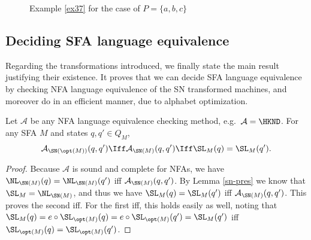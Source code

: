 \begin{example}
\begin{figure}
\caption{Example \ref{ex37} for the case of $P = \{a, b, c\}$}
\begin{center}
\end{center}
\end{figure}

\end{example}


\subsection{Deciding SFA language equivalence}
\label{wrapup}

Regarding the transformations introduced, we finally state the main result justifying their existence. It proves that we can decide SFA language equivalence by checking NFA language equivalence of the SN transformed machines, and moreover do in an efficient manner, due to alphabet optimization.

\begin{thm}
Let $\mathcal{A}$ be any NFA language equivalence checking method, e.g.~$\mathcal{A} = \HKND$. For any SFA $M$ and states $q,q' \in Q_M$,
\begin{equation*}
\mathcal{A}_{\SN(\opt(M))}(q,q') \Iff
\mathcal{A}_{\SN(M)}(q,q') \Iff
\SL_M(q) = \SL_M(q').
\end{equation*}
\end{thm}

\begin{proof}
Because $\mathcal{A}$ is sound and complete for NFAs, we have $\NL_{\SN(M)}(q) = \NL_{\SN(M)}(q')$ iff $\mathcal{A}_{\SN(M)}(q,q')$. By Lemma \ref{sn-pres} we know that $\SL_M = \NL_{\SN(M)}$, and thus we have $\SL_M(q) = \SL_M(q')$ iff $\mathcal{A}_{\SN(M)}(q,q')$. This proves the second iff. For the first iff, this holds easily as well, noting that $\SL_M(q) = e \circ \SL_{\opt(M)}(q) = e \circ \SL_{\opt(M)}(q') = \SL_M(q')$ iff $\SL_{\opt(M)}(q) = \SL_{\opt(M)}(q')$.
\end{proof}

